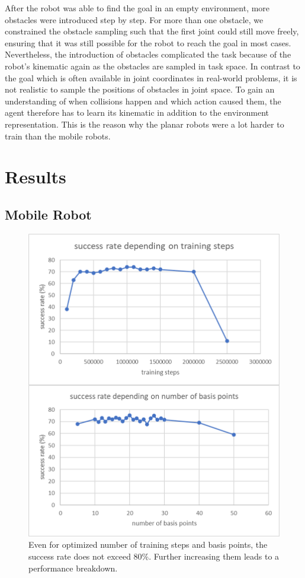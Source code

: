 \documentclass[conference]{IEEEtran}
\begin{document}
After the robot was able to find the goal in an empty environment, more obstacles were introduced step by step. For more than one obstacle, we constrained the obstacle sampling such that the first joint could still move freely, ensuring that it was still possible for the robot to reach the goal in most cases. Nevertheless, the introduction of obstacles complicated the task because of the robot's kinematic again as the obstacles are sampled in task space. In contrast to the goal which is often available in joint coordinates in real-world problems, it is not realistic to sample the positions of obstacles in joint space. To gain an understanding of when collisions happen and which action caused them, the agent therefore has to learn its kinematic in addition to the environment representation. This is the reason why the planar robots were a lot harder to train than the mobile robots.

\section{Results}

\subsection{Mobile Robot}

\begin{figure}[htbp]
	\centerline{\includegraphics{mobile.png}}
	\caption{Even for optimized number of training steps and basis points, the success rate does not exceed 80\%. Further increasing them leads to a performance breakdown.}
	\label{fig5}
\end{figure}
\end{document}
